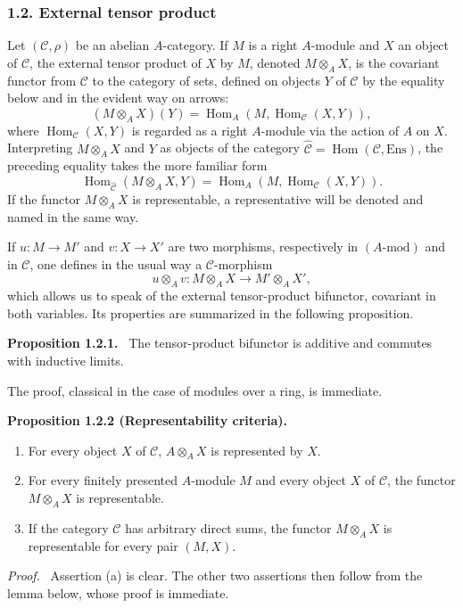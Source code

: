 \documentclass[11pt]{article}
\newenvironment{statement}[1]{\par\medskip\noindent\textbf{#1.}\ }{\par\medskip}
\newenvironment{prooftext}[1][Proof]{\par\noindent\emph{#1.}\ }{\par\medskip}
\DeclareMathOperator{\Hom}{Hom}
\providecommand{\Hom}{\operatorname{Hom}}
\providecommand{\Ens}{\mathrm{Ens}}
\providecommand{\cC}{\mathcal C}
\providecommand{\Ens}{\operatorname{Ens}}
\providecommand{\cC}{\mathcal C}
\begin{document}
\subsubsection*{1.2. External tensor product}
Let $(\cC,\rho)$ be an abelian $A$-category. If $M$ is a right $A$-module and $X$ an object of $\cC$, the external tensor product of $X$ by $M$, denoted $M\otimes_A X$, is the covariant functor from $\cC$ to the category of sets, defined on objects $Y$ of $\cC$ by the equality below and in the evident way on arrows:
\[
(M\otimes_A X)(Y)=\Hom_A(M,\Hom_{\cC}(X,Y)),
\]
where $\Hom_{\cC}(X,Y)$ is regarded as a right $A$-module via the action of $A$ on $X$. Interpreting $M\otimes_AX$ and $Y$ as objects of the category $\widehat{\cC}=\Hom(\cC,\Ens)$, the preceding equality takes the more familiar form
\[
\Hom_{\widehat{\cC}}(M\otimes_A X,Y)=\Hom_A(M,\Hom_{\cC}(X,Y)).
\]
If the functor $M\otimes_A X$ is representable, a representative will be denoted and named in the same way.

If $u:M\to M'$ and $v:X\to X'$ are two morphisms, respectively in $(A\text{-mod})$ and in $\cC$, one defines in the usual way a $\cC$-morphism
\[
u\otimes_A v:M\otimes_A X\longrightarrow M'\otimes_A X',
\]
which allows us to speak of the external tensor-product bifunctor, covariant in both variables. Its properties are summarized in the following proposition.

\begin{statement}{Proposition 1.2.1}
The tensor-product bifunctor is additive and commutes with inductive limits.
\end{statement}
The proof, classical in the case of modules over a ring, is immediate.

\begin{statement}{Proposition 1.2.2 (Representability criteria)}
\begin{enumerate}[label=(\alph*)]
\item For every object $X$ of $\cC$, $A\otimes_AX$ is represented by $X$.
\item For every finitely presented $A$-module $M$ and every object $X$ of $\cC$, the functor $M\otimes_AX$ is representable.
\item If the category $\cC$ has arbitrary direct sums, the functor $M\otimes_A X$ is representable for every pair $(M,X)$.
\end{enumerate}
\end{statement}

\begin{prooftext}[Proof]
Assertion (a) is clear. The other two assertions then follow from the lemma below, whose proof is immediate.
\end{prooftext}
\end{document}
